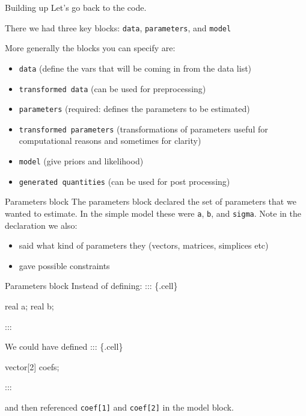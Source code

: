 \documentclass[
  11pt,
  ignorenonframetext,
]{beamer}
\newenvironment{Shaded}{\begin{snugshade}}{\end{snugshade}}
\newcommand{\DecValTok}[1]{\textcolor[rgb]{0.68,0.00,0.00}{#1}}
\newcommand{\NormalTok}[1]{\textcolor[rgb]{0.00,0.23,0.31}{#1}}
\providecommand{\tightlist}{%
  \setlength{\itemsep}{0pt}\setlength{\parskip}{0pt}}\usepackage{longtable,booktabs,array}
\begin{document}
\begin{frame}[fragile]{Building up}
\protect\hypertarget{building-up}{}
Let's go back to the code.

There we had three key blocks: \texttt{data}, \texttt{parameters}, and
\texttt{model}

More generally the blocks you can specify are:

\begin{itemize}
\tightlist
\item
  \texttt{data} (define the vars that will be coming in from the data
  list)
\item
  \texttt{transformed\ data} (can be used for preprocessing)
\item
  \texttt{parameters} (required: defines the parameters to be estimated)
\item
  \texttt{transformed\ parameters} (transformations of parameters useful
  for computational reasons and sometimes for clarity)
\item
  \texttt{model} (give priors and likelihood)
\item
  \texttt{generated\ quantities} (can be used for post processing)
\end{itemize}
\end{frame}

\begin{frame}[fragile]{Parameters block}
\protect\hypertarget{parameters-block}{}
The parameters block declared the set of parameters that we wanted to
estimate. In the simple model these were \texttt{a}, \texttt{b}, and
\texttt{sigma}. Note in the declaration we also:

\begin{itemize}
\tightlist
\item
  said what kind of parameters they (vectors, matrices, simplices etc)
\item
  gave possible constraints
\end{itemize}
\end{frame}

\begin{frame}[fragile]{Parameters block}
\protect\hypertarget{parameters-block-1}{}
Instead of defining: ::: \{.cell\}

\begin{Shaded}
\begin{Highlighting}[]
\NormalTok{real a;}
\NormalTok{real b;}
\end{Highlighting}
\end{Shaded}

:::

We could have defined ::: \{.cell\}

\begin{Shaded}
\begin{Highlighting}[]
\NormalTok{vector[}\DecValTok{2}\NormalTok{] coefs;}
\end{Highlighting}
\end{Shaded}

:::

and then referenced \texttt{coef{[}1{]}} and \texttt{coef{[}2{]}} in the
model block.
\end{frame}
\end{document}

